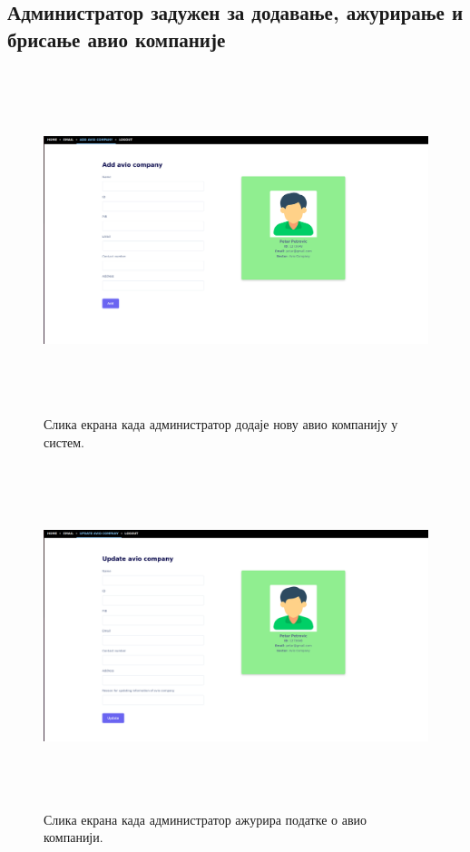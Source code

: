\documentclass{article}
\begin{document}
\subsection{Администратор задужен за додавање, ажурирање и брисање авио компаније}

\begin{figure}[H]
    \begin{center}
        \includegraphics[width=1.1\textwidth, height=10cm]{Dizajn/add_avio_company.png}
        \caption{Слика екрана када администратор додаје нову авио компанију у систем.}
    \end{center}
\end{figure}

\begin{figure}[H]
    \begin{center}
        \includegraphics[width=1.1\textwidth, height=10cm]{Dizajn/update_avio_company.png}
        \caption{Слика екрана када администратор ажурира податке о авио компанији.}
    \end{center}
\end{figure}
\end{document}
